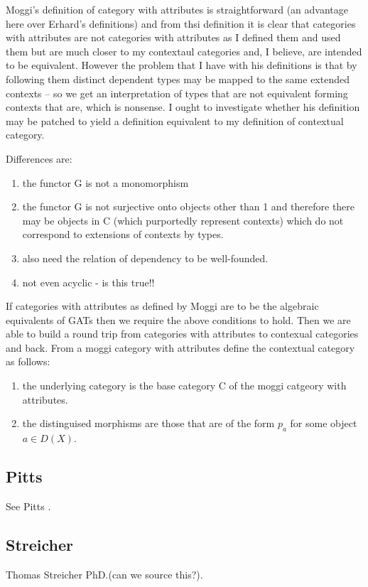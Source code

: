 \documentclass[14pt,a4paper]{scrartcl}
\begin{document}
Moggi's definition of category with attributes is straightforward (an advantage here over Erhard's definitions) and from thsi definition it is clear that categories with attributes are not categories with attributes as I defined them and used them but are much closer to my contextaul categories
and, I believe,  are intended to be equivalent. However the problem that I have with his definitions
is  that by following them distinct dependent types may be mapped to the same extended contexts -- so we get an interpretation of types that are not equivalent forming contexts that are,  which is nonsense.  I ought to investigate whether his definition may be patched to yield a definition equivalent to my definition of contextual category.

\noindent
Differences are:
\begin{enumerate}
\item the functor G is not a monomorphism
\item the functor G is not surjective onto objects other than 1 and therefore there may be objects in C (which purportedly represent contexts) which do not correspond to extensions of contexts by types. 
\item also need the relation of dependency to be well-founded.
\item not even acyclic - is this true!!
\end{enumerate}

\noindent
If categories with attributes as defined by Moggi are to be the algebraic equivalents of GATs then we require the above conditions to hold. Then we are able to build a round trip
 from categories with 
attributes to contexual categories and back. 
\noindent From a moggi category with attributes define the contextual category as follows:
\begin{enumerate}
\item the underlying category is the base category C of the moggi catgeory with attributes.
\item the distinguised morphisms are those that are of the form $p_a$ for some object $a \in D(X)$.
\end{enumerate}


\subsection{Pitts}
See Pitts \cite{pitts2000}.

\subsection{Streicher}
Thomas Streicher PhD.(can we source this?).
\end{document}
